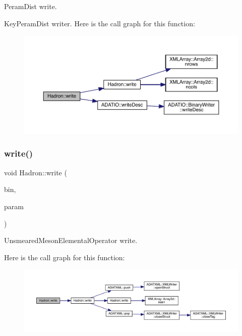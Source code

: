 Peram\+Dist write. 

Key\+Peram\+Dist writer. Here is the call graph for this function\+:\nopagebreak
\begin{figure}[H]
\begin{center}
\leavevmode
\includegraphics[width=350pt]{d1/daf/namespaceHadron_a1f7e7b8c782fddd330a9f4491bd37e22_cgraph}
\end{center}
\end{figure}
\mbox{\label{namespaceHadron_ac88cbe3678a2276ee3dd2d55fff0cabf}} 
\subsubsection{\texorpdfstring{write()}{write()}\hspace{0.1cm}{\footnotesize\ttfamily [27/95]}}
{\footnotesize\ttfamily void Hadron\+::write (\begin{DoxyParamCaption}\item[{\mbox{\hyperlink{classADATIO_1_1BinaryWriter}{Binary\+Writer}} \&}]{bin,  }\item[{const \mbox{\hyperlink{structHadron_1_1KeyUnsmearedMesonElementalOperator__t}{Key\+Unsmeared\+Meson\+Elemental\+Operator\+\_\+t}} \&}]{param }\end{DoxyParamCaption})}



Unsmeared\+Meson\+Elemental\+Operator write. 

Here is the call graph for this function\+:\nopagebreak
\begin{figure}[H]
\begin{center}
\leavevmode
\includegraphics[width=350pt]{d1/daf/namespaceHadron_ac88cbe3678a2276ee3dd2d55fff0cabf_cgraph}
\end{center}
\end{figure}
\mbox{\label{namespaceHadron_abf12b2168d7e3741fcc320bf4b8c53df}} 
